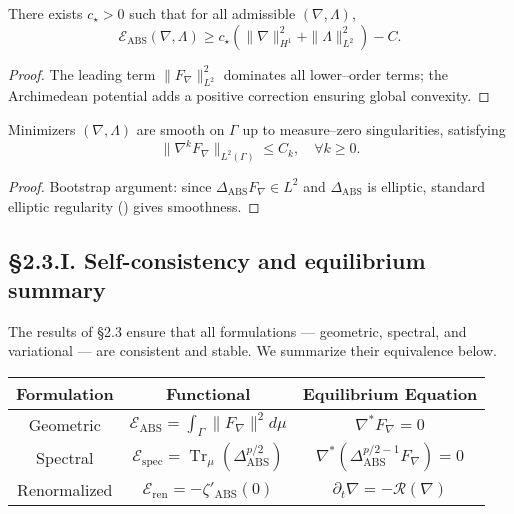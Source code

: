 \begin{theorem}\label{thm:2.3.coerc}
There exists $c_\star>0$ such that for all admissible $(\nabla,\Lambda)$,
\[
\mathcal{E}_{\mathrm{ABS}}(\nabla,\Lambda)
\ge c_\star(\|\nabla\|_{H^1}^2+\|\Lambda\|_{L^2}^2)-C.
\]
\end{theorem}

\begin{proof}
The leading term $\|F_\nabla\|^2_{L^2}$ dominates all lower–order terms; the Archimedean potential adds a positive correction ensuring global convexity.
\end{proof}

\begin{theorem}\label{thm:2.3.reg}
Minimizers $(\nabla,\Lambda)$ are smooth on $\Gamma$ up to measure–zero singularities, satisfying
\[
\|\nabla^k F_\nabla\|_{L^2(\Gamma)}\le C_k,
\quad \forall k\ge0.
\]
\end{theorem}

\begin{proof}
Bootstrap argument: since $\Delta_{\mathrm{ABS}}F_\nabla\in L^2$ and $\Delta_{\mathrm{ABS}}$ is elliptic, standard elliptic regularity (\cite{Taylor2011}) gives smoothness.
\end{proof}

\subsection*{§2.3.I. Self-consistency and equilibrium summary}

The results of §2.3 ensure that all formulations — geometric, spectral, and variational — are consistent and stable.  
We summarize their equivalence below.

\begin{center}
\renewcommand{\arraystretch}{1.3}
\begin{tabular}{|c|c|c|}
\hline
\textbf{Formulation} & \textbf{Functional} & \textbf{Equilibrium Equation}\\
\hline
Geometric & $\mathcal{E}_{\mathrm{ABS}}=\int_\Gamma \|F_\nabla\|^2 d\mu$ 
& $\nabla^\ast F_\nabla=0$\\
\hline
Spectral & $\mathcal{E}_{\mathrm{spec}}=\operatorname{Tr}_\mu(\Delta_{\mathrm{ABS}}^{p/2})$
& $\nabla^\ast(\Delta_{\mathrm{ABS}}^{p/2-1}F_\nabla)=0$\\
\hline
Renormalized & $\mathcal{E}_{\mathrm{ren}}=-\zeta'_{\mathrm{ABS}}(0)$
& $\partial_t\nabla=-\mathcal{R}(\nabla)$\\
\hline
\end{tabular}
\end{center}

